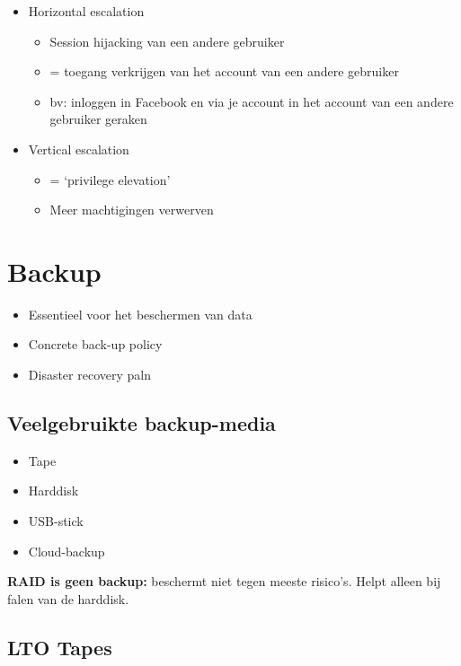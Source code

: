 \documentclass{article}
\newcommand{\bold}[1]{\textbf{#1}}
\begin{document}
\begin{itemize}
    \item Horizontal escalation
    \begin{itemize}
        \item Session hijacking van een andere gebruiker
        \item = toegang verkrijgen van het account van een andere gebruiker
        \item bv: inloggen in Facebook en via je account in het account van een andere gebruiker geraken
    \end{itemize}
    \item Vertical escalation
    \begin{itemize}
        \item = `privilege elevation'
        \item Meer machtigingen verwerven
    \end{itemize}
\end{itemize}


\section{Backup}

\begin{itemize}
    \item Essentieel voor het beschermen van data
    \item Concrete back-up policy
    \item Disaster recovery paln
\end{itemize}

\subsection{Veelgebruikte backup-media}
\begin{itemize}
    \item Tape
    \item Harddisk
    \item USB-stick
    \item Cloud-backup
\end{itemize}

\bold{RAID is geen backup:} beschermt niet tegen meeste risico's. Helpt alleen bij falen van de harddisk. 

\subsection{LTO Tapes}
\end{document}
